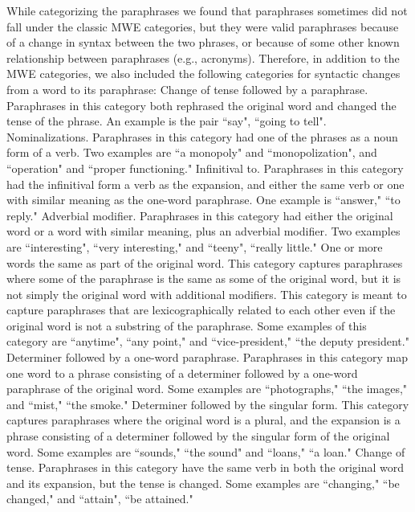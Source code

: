\documentclass[11pt]{article}
\begin{document}
While categorizing the paraphrases we found that paraphrases sometimes did not fall under the classic MWE categories, but they were valid paraphrases because of a change in syntax between the two phrases, or because of some other known relationship between paraphrases (e.g., acronyms). Therefore, in addition to the MWE categories, we also included the following categories for syntactic changes from a word to its paraphrase: 
Change of tense followed by a paraphrase. Paraphrases in this category both rephrased the original word and changed the tense of the phrase. An example is the pair ``say", ``going to tell". 
Nominalizations. Paraphrases in this category had one of the phrases as a noun form of a verb. Two examples are ``a monopoly" and ``monopolization", and ``operation" and  ``proper functioning." 
Infinitival to. Paraphrases in this category had the infinitival form a verb as the expansion, and either the same verb or one with similar meaning as the one-word paraphrase. One example is ``answer," ``to reply."
Adverbial modifier. Paraphrases in this category had either the original word or a word with similar meaning, plus an adverbial modifier. Two examples are ``interesting", ``very interesting," and ``teeny", ``really little."
One or more words the same as part of the original word. This category captures paraphrases where some of the paraphrase is the same as some of the original word, but it is not simply the original word with additional modifiers. This category is meant to capture paraphrases that are lexicographically related to each other even if the original word is not a substring of the paraphrase. Some examples of this category are ``anytime", ``any point," and ``vice-president," ``the deputy president."
Determiner followed by a one-word paraphrase. Paraphrases in this category map one word to a phrase consisting of a determiner followed by a one-word paraphrase of the original word. Some examples are ``photographs," ``the images," and ``mist," ``the smoke."
Determiner followed by the singular form. This category captures paraphrases where the original word is a plural, and the expansion is a phrase consisting of a determiner followed by the singular form of the original word. Some examples are ``sounds," ``the sound" and ``loans," ``a loan."
Change of tense. Paraphrases in this category have the same verb in both the original word and its expansion, but the tense is changed. Some examples are ``changing," ``be changed," and ``attain", ``be attained."
\end{document}
